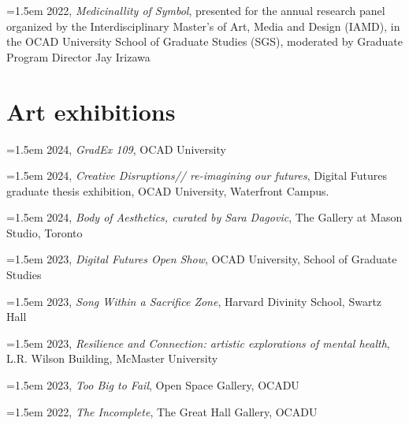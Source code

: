 \noindent\hangindent=1.5em 2022, \textit{Medicinallity of Symbol}, presented for the annual research panel organized by the Interdisciplinary Master’s of Art, Media and Design (IAMD), in the OCAD University School of Graduate Studies (SGS), moderated by Graduate Program Director Jay Irizawa

\section{Art exhibitions}
\noindent\hangindent=1.5em 2024, \textit{GradEx 109}, OCAD University

\noindent\hangindent=1.5em 2024, \textit{Creative Disruptions// re-imagining our futures}, Digital Futures graduate thesis exhibition, OCAD University, Waterfront Campus. 
 
\noindent\hangindent=1.5em 2024, \textit{Body of Aesthetics, curated by Sara Dagovic}, The Gallery at Mason Studio, Toronto

\noindent\hangindent=1.5em 2023, \textit{Digital Futures Open Show}, OCAD University, School of Graduate Studies

\noindent\hangindent=1.5em 2023, \textit{Song Within a Sacrifice Zone}, Harvard Divinity School, Swartz Hall
 
\noindent\hangindent=1.5em 2023, \textit{Resilience and Connection: artistic explorations of mental health}, L.R. Wilson Building, McMaster University 
 
\noindent\hangindent=1.5em 2023, \emph{Too Big to Fail}, Open Space Gallery, OCADU
 
\noindent\hangindent=1.5em 2022, \textit{The Incomplete}, The Great Hall Gallery, OCADU
\clearpage

